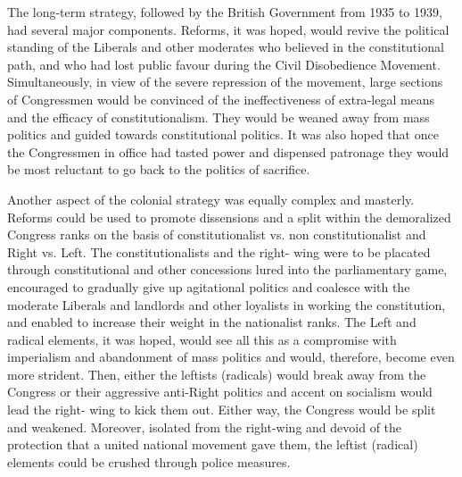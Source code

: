 \begin{multicols}{2}
The long-term strategy, followed by the British Government from 1935 to 1939, had several major components. Reforms, it was hoped, would revive the political standing of the Liberals and other moderates who believed in the constitutional path, and who had lost public favour during the Civil Disobedience Movement. Simultaneously, in view of the severe repression of the movement, large sections of Congressmen would be convinced of the ineffectiveness of extra-legal means and the efficacy of constitutionalism. They would be weaned away from mass politics and guided towards constitutional politics. It was also hoped that once the Congressmen in office had tasted power and dispensed patronage they would be most reluctant to go back to the politics of sacrifice. 

Another aspect of the colonial strategy was equally complex and masterly. Reforms could be used to promote dissensions and a split within the demoralized Congress ranks on the basis of constitutionalist vs. non constitutionalist and Right vs. Left. The constitutionalists and the right- wing were to be placated through constitutional and other concessions lured into the parliamentary game, encouraged to gradually give up agitational politics and coalesce with the moderate Liberals and landlords and other loyalists in working the constitution, and enabled to increase their weight in the nationalist ranks. The Left and radical elements, it was hoped, would see all this as a compromise with imperialism and abandonment of mass politics and would, therefore, become even more strident. Then, either the leftists (radicals) would break away from the Congress or their aggressive anti-Right politics and accent on socialism would lead the right- wing to kick them out. Either way, the Congress would be split and weakened. Moreover, isolated from the right-wing and devoid of the protection that a united national movement gave them, the leftist (radical) elements could be crushed through police measures. 


\end{multicols}
